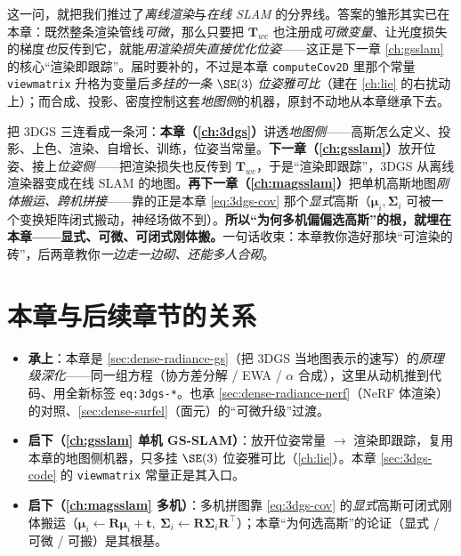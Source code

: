 这一问，就把我们推过了\emph{离线渲染}与\emph{在线 SLAM} 的分界线。答案的雏形其实已在本章：既然整条渲染管线\emph{可微}，那么只要把 $\mathbf T_{wc}$ 也注册成\emph{可微变量}、让光度损失的梯度\emph{也}反传到它，就能\emph{用渲染损失直接优化位姿}——这正是下一章 \cref{ch:gsslam} 的核心“渲染即跟踪”。届时要补的，不过是本章 \texttt{computeCov2D} 里那个常量 \texttt{viewmatrix} 升格为变量后\emph{多挂的一条 $\SE(3)$ 位姿雅可比}（建在 \cref{ch:lie} 的右扰动上）；而合成、投影、密度控制这套\emph{地图侧}的机器，原封不动地从本章继承下去。

\begin{insight}
把 3DGS 三连看成一条河：\textbf{本章（\cref{ch:3dgs}）}讲透\emph{地图侧}——高斯怎么定义、投影、上色、渲染、自增长、训练，位姿当常量。\textbf{下一章（\cref{ch:gsslam}）}放开位姿、接上\emph{位姿侧}——把渲染损失也反传到 $\mathbf T_{wc}$，于是“渲染即跟踪”，3DGS 从离线渲染器变成在线 SLAM 的地图。\textbf{再下一章（\cref{ch:magsslam}）}把单机高斯地图\emph{刚体搬运、跨机拼接}——靠的正是本章 \cref{eq:3dgs-cov} 那个\emph{显式}高斯（$\boldsymbol\mu_i,\boldsymbol\Sigma_i$ 可被一个变换矩阵闭式搬动，神经场做不到）。\textbf{所以“为何多机偏偏选高斯”的根，就埋在本章——显式、可微、可闭式刚体搬。}一句话收束：本章教你造好那块“可渲染的砖”，后两章教你\emph{一边走一边砌、还能多人合砌}。
\end{insight}

\section*{本章与后续章节的关系}
\begin{itemize}
  \item \textbf{承上}：本章是 \cref{sec:dense-radiance-gs}（把 3DGS 当地图表示的速写）的\emph{原理级深化}——同一组方程（协方差分解 / EWA / $\alpha$ 合成），这里从动机推到代码、用全新标签 \texttt{eq:3dgs-*}。也承 \cref{sec:dense-radiance-nerf}（NeRF 体渲染）的对照、\cref{sec:dense-surfel}（面元）的“可微升级”过渡。
  \item \textbf{启下（\cref{ch:gsslam} 单机 GS-SLAM）}：放开位姿常量 $\to$ 渲染即跟踪，复用本章的地图侧机器，只多挂 $\SE(3)$ 位姿雅可比（\cref{ch:lie}）。本章 \cref{sec:3dgs-code} 的 \texttt{viewmatrix} 常量正是其入口。
  \item \textbf{启下（\cref{ch:magsslam} 多机）}：多机拼图靠 \cref{eq:3dgs-cov} 的\emph{显式}高斯可闭式刚体搬运（$\boldsymbol\mu_i\!\leftarrow\!\mathbf R\boldsymbol\mu_i+\mathbf t,\ \boldsymbol\Sigma_i\!\leftarrow\!\mathbf R\boldsymbol\Sigma_i\mathbf R^\top$）；本章“为何选高斯”的论证（显式 / 可微 / 可搬）是其根基。
\end{itemize}

